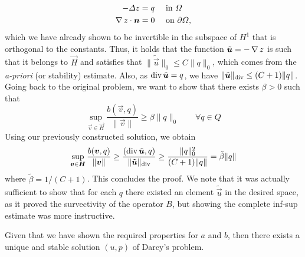 \begin{itemize}
    \begin{equation}
        \begin{aligned}
            - \Delta z &= q && \tin \Omega \\
            \grad z\cdot \vec n &= 0 &&\ton \partial\Omega,
        \end{aligned}
    \end{equation}
    which we have already shown to be invertible in the subspace of $H^1$ that is orthogonal to the constants. Thus, it holds that the function $\tilde{\vec u} = -\grad z$ is such that it belongs to $\vec H$ and satisfies that $\|\tilde{\vec u}\|_0 \leq C \| q\|_0$, which comes from the \emph{a-priori} (or stability) estimate. Also, as $\dive \tilde{\vec u} = q$, we have $\|\tilde{\vec u}\|_{\dive} \leq (C+1)\|q\|$. Going back to the original problem, we want to show that there exists $\beta>0$ such that
    \begin{equation}
        \sup_{\vec v\in \vec H}\frac{b(\vec v, q)}{\|\vec v\|} \geq \beta \|q\|_0 \qquad \forall q \in Q
    \end{equation}
    Using our previously constructed solution, we obtain
    \begin{equation}
        \sup_{\vec v\in \vec H}\frac{b(\vec v, q)}{\|\vec v\|} \geq \frac{(\dive \tilde{\vec u}, q)}{\|\tilde{\vec u}\|_{\dive}}\geq \frac{\|q\|_0^2}{(C+1)\|q\|} = \tilde\beta \|q\|
    \end{equation}
    where $\tilde \beta = 1/(C+1)$. This concludes the proof. We note that it was actually sufficient to show that for each $q$ there existed an element $\tilde{\vec u}$ in the desired space, as it proved the survectivity of the operator $B$, but showing the complete inf-sup estimate was more instructive. 
\end{itemize}
Given that we have shown the required properties for $a$ and $b$, then there exists a unique and stable solution $(u,p)$ of Darcy's problem.
